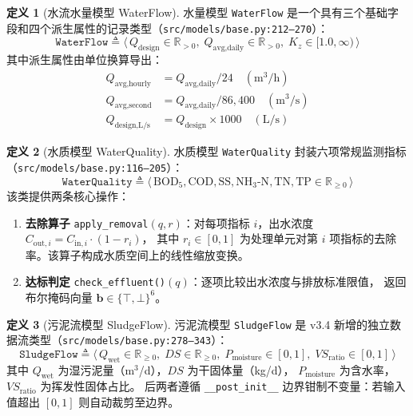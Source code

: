 \documentclass[12pt,a4paper]{ctexart}
\theoremstyle{definition}
\newtheorem{definition}{定义}[section]
\theoremstyle{remark}
\begin{document}
\begin{definition}[水流水量模型 WaterFlow]
\label{def:waterflow}
水量模型 \texttt{WaterFlow} 是一个具有三个基础字段和四个派生属性的记录类型（\texttt{src/models/base.py:212--270}）：
\[
\texttt{WaterFlow} \triangleq \langle\,
  Q_{\text{design}} \in \mathbb{R}_{>0},\;
  Q_{\text{avg,daily}} \in \mathbb{R}_{>0},\;
  K_z \in [1.0, \infty)
\,\rangle
\]
其中派生属性由单位换算导出：
\begin{align*}
  Q_{\text{avg,hourly}} &= Q_{\text{avg,daily}} / 24 \quad (\text{m}^3/\text{h}) \\
  Q_{\text{avg,second}} &= Q_{\text{avg,daily}} / 86,400 \quad (\text{m}^3/\text{s}) \\
  Q_{\text{design,L/s}} &= Q_{\text{design}} \times 1000 \quad (\text{L/s})
\end{align*}
\end{definition}

\begin{definition}[水质模型 WaterQuality]
\label{def:waterquality}
水质模型 \texttt{WaterQuality} 封装六项常规监测指标（\texttt{src/models/base.py:116--205}）：
\[
\texttt{WaterQuality} \triangleq \langle\,
  \text{BOD}_5, \text{COD}, \text{SS}, \text{NH}_3\text{-N}, \text{TN}, \text{TP} \in \mathbb{R}_{\ge 0}
\,\rangle
\]
该类提供两条核心操作：
\begin{enumerate}
  \item \textbf{去除算子} \texttt{apply\_removal}$(q, r)$：对每项指标 $i$，出水浓度 $C_{\text{out},i} = C_{\text{in},i} \cdot (1 - r_i)$，
        其中 $r_i \in [0, 1]$ 为处理单元对第 $i$ 项指标的去除率。该算子构成水质空间上的线性缩放变换。
  \item \textbf{达标判定} \texttt{check\_effluent()}$(q)$：逐项比较出水浓度与排放标准限值，
        返回布尔掩码向量 $\mathbf{b} \in \{\top, \bot\}^6$。
\end{enumerate}
\end{definition}

\begin{definition}[污泥流模型 SludgeFlow]
\label{def:sludgeflow}
污泥流模型 \texttt{SludgeFlow} 是 v3.4 新增的独立数据流类型（\texttt{src/models/base.py:278--343}）：
\[
\texttt{SludgeFlow} \triangleq \langle\,
  Q_{\text{wet}} \in \mathbb{R}_{\ge 0},\;
  DS \in \mathbb{R}_{\ge 0},\;
  P_{\text{moisture}} \in [0, 1],\;
  VS_{\text{ratio}} \in [0, 1]
\,\rangle
\]
其中 $Q_{\text{wet}}$ 为湿污泥量（m$^3$/d），$DS$ 为干固体量（kg/d），
$P_{\text{moisture}}$ 为含水率，$VS_{\text{ratio}}$ 为挥发性固体占比。
后两者遵循 \texttt{\_\_post\_init\_\_} 边界钳制不变量：若输入值超出 $[0,1]$ 则自动裁剪至边界。
\end{definition}
\end{document}
